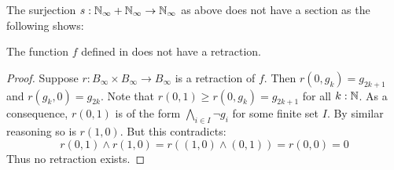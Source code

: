 The surjection $s:\mathbb{N}_{\infty} + \mathbb{N}_{\infty} \to \mathbb{N}_{\infty}$ as above does not have a section 
as the following shows:
\begin{lemma}
  The function $f$ defined in  does not have a retraction. 
\end{lemma}
\begin{proof}
  Suppose $r:B_\infty \times B_\infty \to B_\infty$ is a retraction of $f$. 
  Then $r(0,g_k) = g_{2k+1}$ and $r(g_k,0) = g_{2k}$. 
  Note that $r(0,1) \geq r(0,g_k) = g_{2k+1}$ for all $k:\mathbb{N}$. 
  As a consequence, $r(0,1)$ is of the form $\bigwedge_{i\in I} \neg g_i$ for some finite set $I$.
  By similar reasoning so is $r(1,0)$. %
  But this contradicts:
  $$r(0,1) \wedge r(1,0) = r( (1,0) \wedge (0,1)) = r(0,0) = 0$$
  Thus no retraction exists. 
\end{proof}


